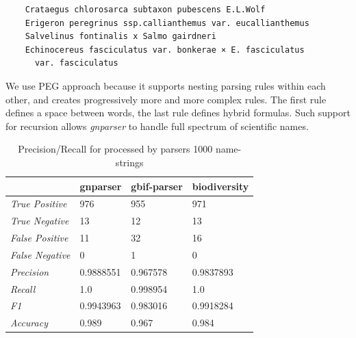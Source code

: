 \documentclass{bmcart}
\begin{document}
\vspace{0.5cm}

\begin{verbatim}
    Crataegus chlorosarca subtaxon pubescens E.L.Wolf
    Erigeron peregrinus ssp.callianthemus var. eucallianthemus
    Salvelinus fontinalis x Salmo gairdneri
    Echinocereus fasciculatus var. bonkerae × E. fasciculatus
      var. fasciculatus
\end{verbatim}

\vspace{0.5cm}

We use PEG approach because it supports nesting parsing rules within each other,
and creates progressively more and more complex rules. The first rule defines a
space between words, the last rule defines hybrid formulas.  Such support for
recursion allows \textit{gnparser} to handle full spectrum of scientific names.

\begin{table}[htb]
  \begin{center}
    \caption{Precision/Recall for processed by parsers 1000
    name-strings}\label{table:precision}
    \resizebox{10cm}{!} {
    \begin{tabular}{|l|*{3}{l}|}
      \hline
                             & gnparser & gbif-parser & biodiversity \\
      \hline
      \textit{True Positive} & 976      & 955         & 971          \\
      \textit{True Negative} & 13       & 12          & 13           \\
      \textit{False Positive}& 11       & 32          & 16           \\
      \textit{False Negative}& 0        & 1           & 0            \\
      \textit{Precision}     & 0.9888551& 0.967578    & 0.9837893    \\
      \textit{Recall}        & 1.0      & 0.998954    & 1.0          \\
      \textit{F1}            & 0.9943963& 0.983016    & 0.9918284    \\
      \textit{Accuracy}      & 0.989    & 0.967       & 0.984        \\
      \hline
    \end{tabular}
    }
  \end{center}
\end{table}
\end{document}
